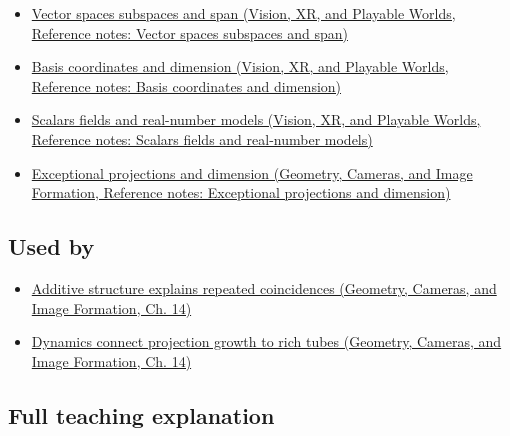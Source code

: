 \hypertarget{appendix-b0732b22e7d6-prerequisites}{}

\begin{itemize}
\tightlist
\item
  \href{../07-Vision-XR-and-Playable-Worlds/main.pdf\#nameddest=appendix-173b52c063ae}{Vector spaces subspaces and span (Vision, XR, and Playable Worlds, Reference notes: Vector spaces subspaces and span)}
\item
  \href{../07-Vision-XR-and-Playable-Worlds/main.pdf\#nameddest=appendix-ce0341f7ea0d}{Basis coordinates and dimension (Vision, XR, and Playable Worlds, Reference notes: Basis coordinates and dimension)}
\item
  \href{../07-Vision-XR-and-Playable-Worlds/main.pdf\#nameddest=appendix-52051ad550fe}{Scalars fields and real-number models (Vision, XR, and Playable Worlds, Reference notes: Scalars fields and real-number models)}
\item
  \href{../03-Geometry-Cameras-and-Image-Formation/main.pdf\#nameddest=appendix-3c73f7862157}{Exceptional projections and dimension (Geometry, Cameras, and Image Formation, Reference notes: Exceptional projections and dimension)}
\end{itemize}

\subsection{Used by}\label{appendix-b0732b22e7d6-used-by}

\hypertarget{appendix-b0732b22e7d6-used-by}{}

\begin{itemize}
\tightlist
\item
  \href{../03-Geometry-Cameras-and-Image-Formation/main.pdf\#nameddest=04-visual-computing-ii-ch033-additive-structure-explains-repeated-coincidences}{Additive structure explains repeated coincidences (Geometry, Cameras, and Image Formation, Ch. 14)}
\item
  \href{../03-Geometry-Cameras-and-Image-Formation/main.pdf\#nameddest=04-visual-computing-ii-ch033-dynamics-connect-projection-growth-to-rich-tubes}{Dynamics connect projection growth to rich tubes (Geometry, Cameras, and Image Formation, Ch. 14)}
\end{itemize}

\subsection{Full teaching explanation}\label{appendix-b0732b22e7d6-full-teaching-explanation}

